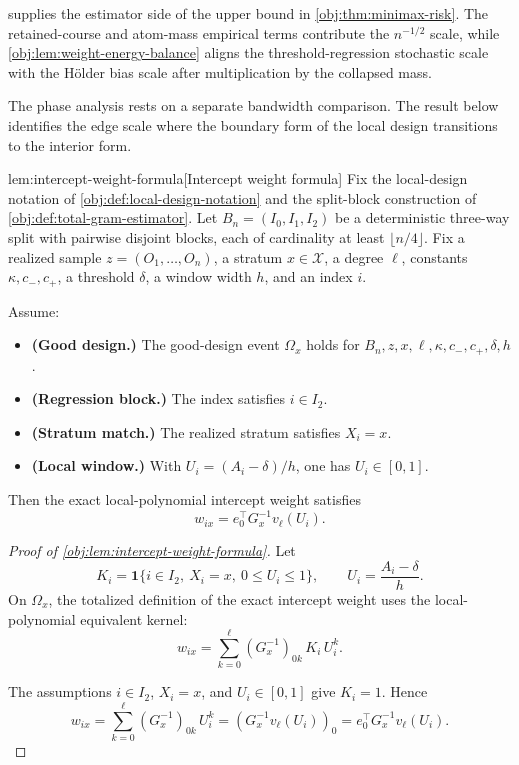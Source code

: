 \documentclass[11pt]{article}
\begin{document}
 supplies the estimator side of the upper bound in \cref{obj:thm:minimax-risk}. The retained-course and atom-mass empirical terms contribute the \(n^{-1/2}\) scale, while \cref{obj:lem:weight-energy-balance} aligns the threshold-regression stochastic scale with the Hölder bias scale after multiplication by the collapsed mass.

The phase analysis rests on a separate bandwidth comparison. The result below identifies the edge scale where the boundary form of the local design transitions to the interior form.

\begin{lemmav}{lem:intercept-weight-formula}[Intercept weight formula]
Fix the local-design notation of \cref{obj:def:local-design-notation} and the split-block construction of \cref{obj:def:total-gram-estimator}.  Let \(B_n=(I_0,I_1,I_2)\) be a deterministic three-way split with pairwise disjoint blocks, each of cardinality at least \(\lfloor n/4\rfloor\).  Fix a realized sample \(z=(O_1,\ldots,O_n)\), a stratum \(x\in\mathcal X\), a degree \(\ell\), constants \(\kappa,c_-,c_+\), a threshold \(\delta\), a window width \(h\), and an index \(i\).

Assume:
\begin{itemize}
\item \textbf{(Good design.)} The good-design event \(\Omega_x\) holds for \(B_n,z,x,\ell,\kappa,c_-,c_+,\delta,h\).
\item \textbf{(Regression block.)} The index satisfies \(i\in I_2\).
\item \textbf{(Stratum match.)} The realized stratum satisfies \(X_i=x\).
\item \textbf{(Local window.)} With \(U_i=(A_i-\delta)/h\), one has \(U_i\in[0,1]\).
\end{itemize}

Then the exact local-polynomial intercept weight satisfies
\[
w_{ix}=e_0^\top G_x^{-1}v_\ell(U_i).
\]
\end{lemmav}

\begin{proof}[Proof of \cref{obj:lem:intercept-weight-formula}]
Let
\[
K_i=\mathbf 1\{i\in I_2,\ X_i=x,\ 0\le U_i\le1\},
\qquad
U_i=\frac{A_i-\delta}{h}.
\]
On \(\Omega_x\), the totalized definition of the exact intercept weight uses the local-polynomial equivalent kernel:
\[
w_{ix}
=
\sum_{k=0}^{\ell}(G_x^{-1})_{0k}\,K_i\,U_i^k .
\]

The assumptions \(i\in I_2\), \(X_i=x\), and \(U_i\in[0,1]\) give \(K_i=1\).  Hence
\[
w_{ix}
=
\sum_{k=0}^{\ell}(G_x^{-1})_{0k}\,U_i^k
=
\left(G_x^{-1}v_\ell(U_i)\right)_0
=
e_0^\top G_x^{-1}v_\ell(U_i).
\]
\end{proof}
\end{document}
